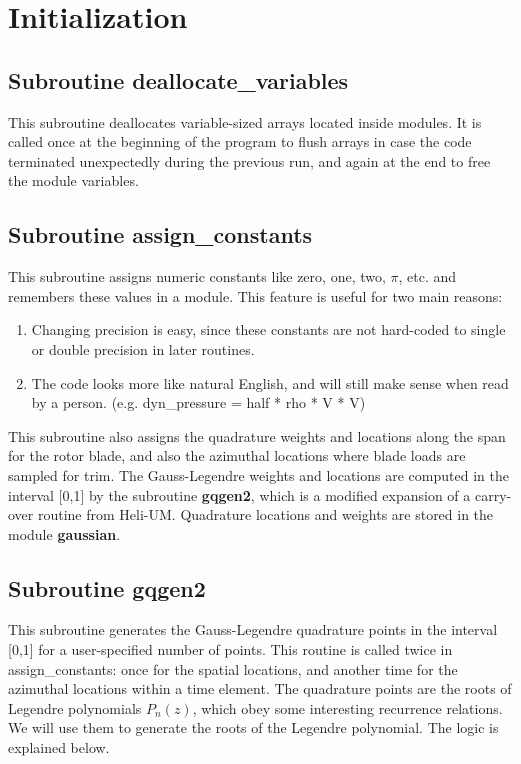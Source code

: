 \section{Initialization}
\subsection{Subroutine deallocate\_variables}
This subroutine deallocates variable-sized arrays located inside modules. It is called once at the beginning of the program to flush arrays in case the code terminated unexpectedly during the previous run, and again at the end to free the module variables.

\subsection{Subroutine assign\_constants}
This subroutine assigns numeric constants like zero, one, two, $\pi$, etc. and remembers these values in a module. This feature is useful for two main reasons:
\begin{enumerate}
\item Changing precision is easy, since these constants are not hard-coded to single or double precision in later routines.
\item The code looks more like natural English, and will still make sense when read by a person. (e.g. dyn\_pressure = half * rho * V * V)
\end{enumerate}

This subroutine also assigns the quadrature weights and locations along the span for the rotor blade, and also the azimuthal locations where blade loads are sampled for trim. The Gauss-Legendre weights and locations are computed in the interval [0,1] by the subroutine \textbf{gqgen2}, which is a modified expansion of a carry-over routine from Heli-UM. Quadrature locations and weights are stored in the module \textbf{gaussian}. 

\subsection{Subroutine gqgen2}
This subroutine generates the Gauss-Legendre quadrature points in the interval [0,1] for a user-specified number of points. This routine is called twice in assign\_constants: once for the spatial locations, and another time for the azimuthal locations within a time element. The quadrature points are the roots of Legendre polynomials $P_n(z)$, which obey some interesting recurrence relations. We will use them to generate the roots of the Legendre polynomial. The logic is explained below.

